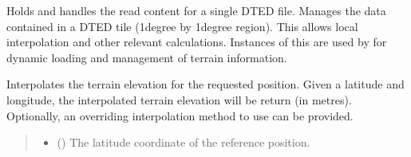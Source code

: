 \documentclass[letterpaper,10pt,english]{sphinxmanual}
\begin{document}
\begin{fulllineitems}
\label{\detokenize{modules/earth/dted:qnav.earth.dted.DtedTile}}
\pysigstartsignatures
{}
\pysigstopsignatures
\sphinxAtStartPar
Holds and handles the read content for a single DTED file.
Manages the data contained in a DTED tile (1\sphinxhyphen{}degree by 1\sphinxhyphen{}degree region).
This allows local interpolation and other relevant calculations. Instances
of this are used by  for dynamic loading and
management of terrain information.

\begin{fulllineitems}
\label{\detokenize{modules/earth/dted:qnav.earth.dted.DtedTile.get_elevation}}
\pysigstartsignatures
{}
\pysigstopsignatures
\sphinxAtStartPar
Interpolates the terrain elevation for the requested position.
Given a latitude and longitude, the interpolated terrain elevation
will be return (in metres). Optionally, an overriding interpolation
method to use can be provided.
\begin{quote}\begin{description}
\begin{itemize}
\item {} 
\sphinxAtStartPar
{} () \textendash{} The latitude coordinate of the reference position.


\end{itemize}
\end{description}
\end{quote}
\end{fulllineitems}
\end{fulllineitems}
\end{document}

